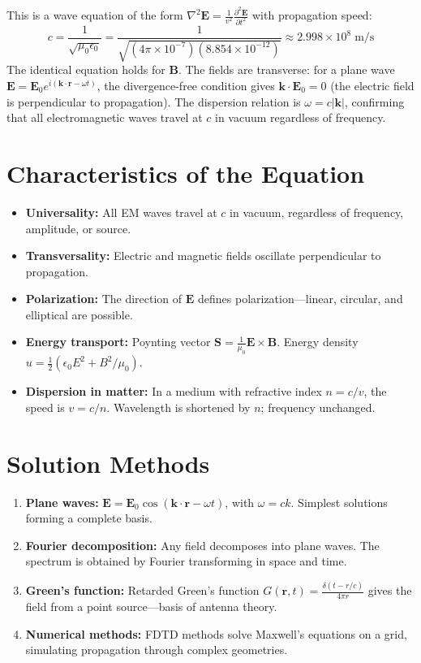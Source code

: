 This is a wave equation of the form $\nabla^2 \mathbf{E} = \frac{1}{v^2}\frac{\partial^2 \mathbf{E}}{\partial t^2}$ with propagation speed:
\begin{equation}
c = \frac{1}{\sqrt{\mu_0\epsilon_0}} = \frac{1}{\sqrt{(4\pi \times 10^{-7})(8.854 \times 10^{-12})}} \approx 2.998 \times 10^8 \;\text{m/s}
\end{equation}
The identical equation holds for $\mathbf{B}$. The fields are transverse: for a plane wave $\mathbf{E} = \mathbf{E}_0 e^{i(\mathbf{k}\cdot\mathbf{r} - \omega t)}$, the divergence-free condition gives $\mathbf{k} \cdot \mathbf{E}_0 = 0$ (the electric field is perpendicular to propagation). The dispersion relation is $\omega = c|\mathbf{k}|$, confirming that all electromagnetic waves travel at $c$ in vacuum regardless of frequency.

\section*{Characteristics of the Equation}

\begin{itemize}
\item \textbf{Universality:} All EM waves travel at $c$ in vacuum, regardless of frequency, amplitude, or source.
\item \textbf{Transversality:} Electric and magnetic fields oscillate perpendicular to propagation.
\item \textbf{Polarization:} The direction of $\mathbf{E}$ defines polarization---linear, circular, and elliptical are possible.
\item \textbf{Energy transport:} Poynting vector $\mathbf{S} = \frac{1}{\mu_0}\mathbf{E} \times \mathbf{B}$. Energy density $u = \frac{1}{2}(\epsilon_0 E^2 + B^2/\mu_0)$.
\item \textbf{Dispersion in matter:} In a medium with refractive index $n = c/v$, the speed is $v = c/n$. Wavelength is shortened by $n$; frequency unchanged.
\end{itemize}
\section*{Solution Methods}

\begin{enumerate}
\item \textbf{Plane waves:} $\mathbf{E} = \mathbf{E}_0 \cos(\mathbf{k} \cdot \mathbf{r} - \omega t)$, with $\omega = ck$. Simplest solutions forming a complete basis.
\item \textbf{Fourier decomposition:} Any field decomposes into plane waves. The spectrum is obtained by Fourier transforming in space and time.
\item \textbf{Green's function:} Retarded Green's function $G(\mathbf{r}, t) = \frac{\delta(t - r/c)}{4\pi r}$ gives the field from a point source---basis of antenna theory.
\item \textbf{Numerical methods:} FDTD methods solve Maxwell's equations on a grid, simulating propagation through complex geometries.
\end{enumerate}
